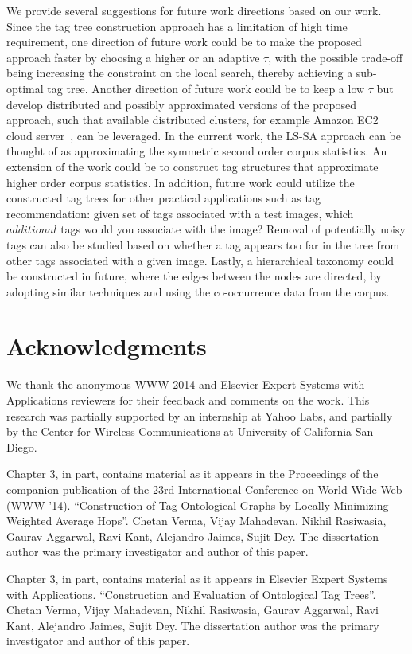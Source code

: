 We provide several suggestions for future work directions based on our work. 
Since the tag tree construction approach has a limitation of high time requirement, one direction of future work could be to make the proposed approach faster by choosing a higher or an adaptive $\tau$, with the possible trade-off being increasing the constraint on the local search, thereby achieving a sub-optimal tag tree. Another direction of future work could be to keep a low $\tau$ but develop distributed and possibly approximated versions of the proposed approach, such that available distributed clusters, for example Amazon EC2 cloud server~\cite{AmazonEC2}, can be leveraged. 
In the current work, the LS-SA approach can be thought of as approximating the symmetric second order corpus statistics. An extension of the work could be to construct tag structures that approximate higher order corpus statistics. 
In addition, future work could utilize the constructed tag trees for other practical applications such as tag recommendation: given set of tags associated with a test images, which $additional$ tags would you associate with the image? Removal of potentially noisy tags can also be studied based on whether a tag appears too far in the tree from other tags associated with a given image. Lastly, a hierarchical taxonomy could be constructed in future, where the edges between the nodes are directed, by adopting similar techniques and using the co-occurrence data from the corpus. 

\section{Acknowledgments} 
We thank the anonymous WWW 2014 and Elsevier Expert Systems with Applications reviewers for their feedback and comments on the work. This research was partially supported by an internship at Yahoo Labs, and partially by the Center for Wireless Communications at University of California San Diego. 

Chapter 3, in part, contains material as it appears in the Proceedings of the companion publication of the 23rd International Conference on World Wide Web (WWW '14). ``Construction of Tag Ontological Graphs by Locally Minimizing Weighted Average Hops''. Chetan Verma, Vijay Mahadevan, Nikhil Rasiwasia, Gaurav Aggarwal, Ravi Kant, Alejandro Jaimes, Sujit Dey. The dissertation author was the primary investigator and author of this paper. 

Chapter 3, in part, contains material as it appears in Elsevier Expert Systems with Applications. ``Construction and Evaluation of Ontological Tag Trees''. Chetan Verma, Vijay Mahadevan, Nikhil Rasiwasia, Gaurav Aggarwal, Ravi Kant, Alejandro Jaimes, Sujit Dey. The dissertation author was the primary investigator and author of this paper. 






